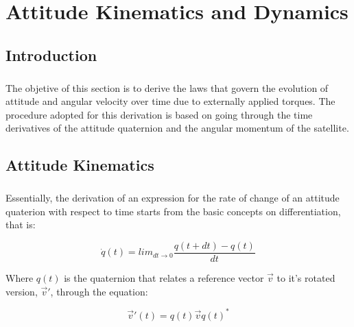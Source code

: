 %
%
%
%
%
%
%
%
%
%

\chapter{Attitude Kinematics and Dynamics} \label{ch:attitude-kinematics-dynamics}

\section{Introduction}

\paragraph{}
\indent 
	The objetive of this section is to derive the laws that govern the evolution of attitude and angular velocity over time due to externally applied torques. The procedure adopted for this derivation is based on going through the time derivatives of the attitude quaternion and the angular momentum of the satellite.

\section{Attitude Kinematics}

\paragraph{}
\indent
	Essentially, the derivation of an expression for the rate of change of an attitude quaterion with respect to time starts from the basic concepts on differentiation, that is:

\begin{equation}
	\dot{q}(t) = lim_{dt \rightarrow 0} \frac{q(t+dt) - q(t)}{dt}
\end{equation}

\indent
	Where $q(t)$ is the quaternion that relates a reference vector $\vec{v}$ to it's rotated version, $\vec{v}'$, through the equation:

\begin{equation}
	\vec{v}'(t) = q(t)\vec{v} q(t)^*
\end{equation}

